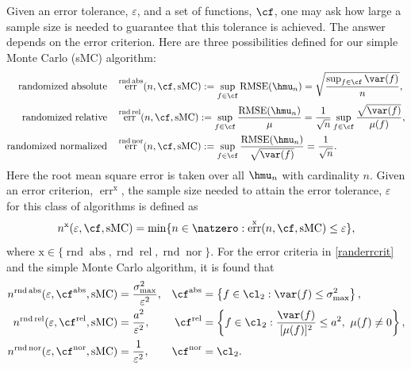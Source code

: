 \documentclass[12pt]{amsart}
\DeclareMathOperator{\RMSE}{RMSE}
\DeclareMathOperator{\rnd}{rnd}
\DeclareMathOperator{\abso}{abs}
\DeclareMathOperator{\rel}{rel}
\DeclareMathOperator{\nor}{nor}
\DeclareMathOperator{\err}{err}
\DeclareMathOperator{\sMC}{sMC}
\begin{document}
Given an error tolerance, $\varepsilon$, and a set of functions, $\cf$, one may ask how large a sample size is needed to guarantee that this tolerance is achieved.  The answer depends on the error criterion.  Here are three possibilities defined for our simple Monte Carlo (sMC) algorithm:
\begin{subequations} \label{randerrcrit}
\begin{align}
\text{randomized absolute} \quad & 
\err^{\rnd\abso}(n,\cf,\sMC) := \sup_{f \in \cf} \RMSE(\hmu_n) =  \sqrt{\frac{\sup_{f \in \cf}\var(f)}{n}},\\
\text{randomized relative} \quad & 
\err^{\rnd\rel}(n,\cf,\sMC) := \sup_{f \in \cf} \frac{\RMSE(\hmu_n)} {\mu}=  \frac{1}{\sqrt{n}} \sup_{f \in \cf} \frac{\sqrt{\var(f)}}{\mu(f)} , \\
\text{randomized normalized} \quad & 
\err^{\rnd\nor}(n,\cf,\sMC) := \sup_{f \in \cf} \frac{\RMSE(\hmu_n)} {\sqrt{\var(f)}} =  \frac{1}{\sqrt{n}}.
\end{align}
\end{subequations}
Here the root mean square error is taken over all $\hmu_n$ with cardinality $n$.  Given an error criterion, $\err^{\text{x}}$, the sample size needed to attain the error tolerance, $\varepsilon$ for this class of algorithms is defined as 
\[
n^{\text{x}}(\varepsilon,\cf,\sMC) = \min \{{n \in \natzero} :  \err^{\text{x}}(n,\cf,\sMC) \le \varepsilon\},
\]
where $\text{x} \in \{\rnd\abso, \rnd\rel, \rnd\nor\}$.
For the error criteria in \eqref{randerrcrit} and the simple Monte Carlo algorithm, it is found that 
\begin{subequations} \label{randerrcritsample}
\begin{align}
n^{\rnd\abso}(\varepsilon,\cf^{\abso},\sMC) &= \frac{\sigma^2_{\max}} {\varepsilon^2}, & \cf^{\abso} &= \left\{f \in \cl_2 : \var(f) \le \sigma^2_{\max} \right\},\\
n^{\rnd\rel}(\varepsilon,\cf^{\rel},\sMC) & = \frac{a^2} {\varepsilon^2}, & \cf^{\rel} &= \left\{f \in \cl_2 : \frac{\var(f)}{[\mu(f)]^2} \le a^2,\ \mu(f) \ne 0 \right\}, \\
n^{\rnd\nor}(\varepsilon,\cf^{\nor},\sMC) & = \frac{1} {\varepsilon^2}, & \cf^{\nor} &= \cl_2.
\end{align}
\end{subequations}
\end{document}
